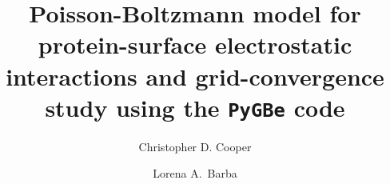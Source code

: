 \documentclass[final,5p,times,twocolumn]{elsarticle}
\newcommand{\pygbe}{\texttt{PyGBe}\xspace}
\begin{document}
\begin{frontmatter}



\title{Poisson-Boltzmann model for protein-surface electrostatic interactions and grid-convergence study using the \pygbe code}

\author[bu,usm]{Christopher D. Cooper}

\author[gwu]{Lorena A.~Barba}

\address[bu]{Department of Mechanical Engineering, Boston University, Boston, MA.}
\address[usm]{Department of Mechanical Engineering, Universidad T\'ecnica Federico Santa Mar\'ia, Valpara\'iso, Chile.}
\address[gwu]{Department of Mechanical \& Aerospace Engineering, The George Washington University, Washington, D.C.}


\begin{abstract}


\end{abstract}
\end{frontmatter}
\end{document}
